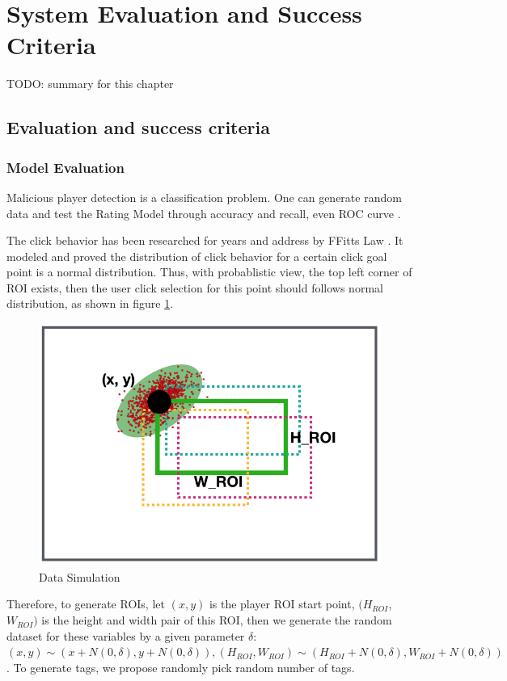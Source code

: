 \section{System Evaluation and Success Criteria}

TODO: summary for this chapter

\subsection{Evaluation and success criteria}
  \subsubsection{Model Evaluation}

  Malicious player detection is a classification problem. 
  One can generate random data and test the Rating Model through accuracy and recall, even ROC curve \cite{hanley1982meaning}.

  The click behavior has been researched for years and address by FFitts Law \cite{bi2013ffitts}.
  It modeled and proved the distribution of click behavior for a certain click goal point is a normal distribution.
  Thus, with probablistic view, the top left corner of ROI exists, then the user click selection 
  for this point should follows normal distribution, as shown in figure \ref{fig:evaluation}.

  \begin{figure}[htp]
  \centering
  \includegraphics[width=0.5\columnwidth]{figures/evaluation}
  \caption{Data Simulation}
  \label{fig:evaluation}
  \end{figure}

  Therefore, to generate ROIs, let $(x, y)$ is the player ROI start point,  $(H_{ROI}$, $W_{ROI})$ is the height
  and width pair of this ROI, then we generate the random dataset for these variables by a given
  parameter $\delta$: $(x, y) \sim (x+N(0, \delta), y+N(0, \delta)), (H_{ROI}, W_{ROI}) \sim (H_{ROI}+N(0, \delta), W_{ROI}+N(0, \delta))$.
  To generate tags, we propose randomly pick random number of tags.

